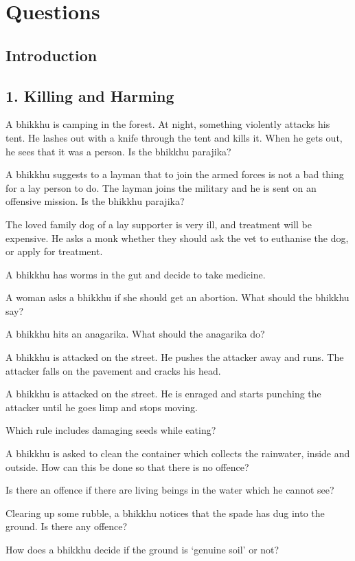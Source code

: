 \chapter{Questions}

\section{Introduction}

\section{1. Killing and Harming}

A bhikkhu is camping in the forest. At night, something violently
attacks his tent. He lashes out with a knife through the tent and kills
it. When he gets out, he sees that it was a person. Is the bhikkhu
parajika?

A bhikkhu suggests to a layman that to join the armed forces is not a
bad thing for a lay person to do. The layman joins the military and he
is sent on an offensive mission. Is the bhikkhu parajika?

The loved family dog of a lay supporter is very ill, and treatment will
be expensive. He asks a monk whether they should ask the vet to
euthanise the dog, or apply for treatment.

A bhikkhu has worms in the gut and decide to take medicine.

A woman asks a bhikkhu if she should get an abortion. What should the
bhikkhu say?

A bhikkhu hits an anagarika. What should the anagarika do?

A bhikkhu is attacked on the street. He pushes the attacker away and
runs. The attacker falls on the pavement and cracks his head.

A bhikkhu is attacked on the street. He is enraged and starts punching
the attacker until he goes limp and stops moving.

Which rule includes damaging seeds while eating?

A bhikkhu is asked to clean the container which collects the rainwater,
inside and outside. How can this be done so that there is no offence?

Is there an offence if there are living beings in the water which he
cannot see?

Clearing up some rubble, a bhikkhu notices that the spade has dug into
the ground. Is there any offence?

How does a bhikkhu decide if the ground is `genuine soil' or not?

